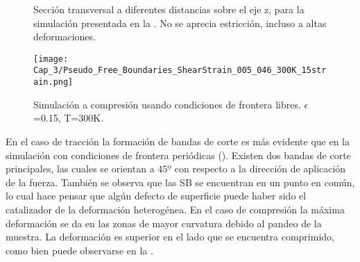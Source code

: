 \begin{figure}[htp]
\centering
{}
\caption[Cortes a diferentes distancias sobre el eje z, condiciones de frontera libres]{Sección transversal a diferentes distancias sobre el eje z, para la simulación presentada en la . No se aprecia estricción, incluso a altas deformaciones.}
\label{C3:fg:cross}
\end{figure}

\begin{figure}[htp]
\centering
\texttt{[image: Cap\_3/Pseudo\_Free\_Boundaries\_ShearStrain\_005\_046\_300K\_15strain.png]}
\caption[Simulación a compresión usando condiciones de frontera libres]{Simulación a compresión usando condiciones de frontera libres. $\epsilon$=0.15, T=300K.}
\label{C3:fg:libresComp}
\end{figure}

En el caso de tracción la formación de bandas de corte es más evidente que en la simulación con condiciones de frontera periódicas (). Existen dos bandas de corte principales, las cuales se orientan a $45º$ con respecto a la dirección de aplicación de la fuerza. También se observa que las SB se encuentran en un punto en común, lo cual hace pensar que algún defecto de superficie puede haber sido el catalizador de la deformación heterogénea. En el caso de compresión la máxima deformación se da en las zonas de mayor curvatura debido al pandeo de la muestra. La deformación es superior en el lado que se encuentra comprimido, como bien puede observarse en la .







